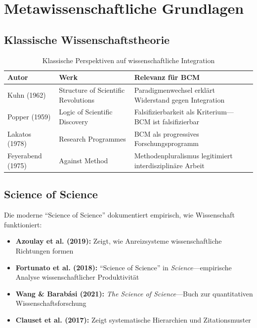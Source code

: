 \documentclass[12pt,a4paper]{article}
\begin{document}
\section{Metawissenschaftliche Grundlagen}

\subsection{Klassische Wissenschaftstheorie}

\begin{table}[htbp]
\centering
\caption{Klassische Perspektiven auf wissenschaftliche Integration}
\renewcommand{\arraystretch}{1.3}
\begin{tabular}{@{}llp{6cm}@{}}
\toprule
\textbf{Autor} & \textbf{Werk} & \textbf{Relevanz für BCM} \\
\midrule
Kuhn (1962) & Structure of Scientific Revolutions &
    Paradigmenwechsel erklärt Widerstand gegen Integration \\
Popper (1959) & Logic of Scientific Discovery &
    Falsifizierbarkeit als Kriterium---BCM ist falsifizierbar \\
Lakatos (1978) & Research Programmes &
    BCM als progressives Forschungsprogramm \\
Feyerabend (1975) & Against Method &
    Methodenpluralismus legitimiert interdisziplinäre Arbeit \\
\bottomrule
\end{tabular}
\end{table}

\subsection{Science of Science}

Die moderne ``Science of Science'' dokumentiert empirisch, wie Wissenschaft funktioniert:

\begin{itemize}[nosep]
\item \textbf{Azoulay et al. (2019):} Zeigt, wie Anreizsysteme wissenschaftliche Richtungen formen
\item \textbf{Fortunato et al. (2018):} ``Science of Science'' in \textit{Science}---empirische Analyse wissenschaftlicher Produktivität
\item \textbf{Wang \& Barabási (2021):} \textit{The Science of Science}---Buch zur quantitativen Wissenschaftsforschung
\item \textbf{Clauset et al. (2017):} Zeigt systematische Hierarchien und Zitationsmuster
\end{itemize}
\end{document}

